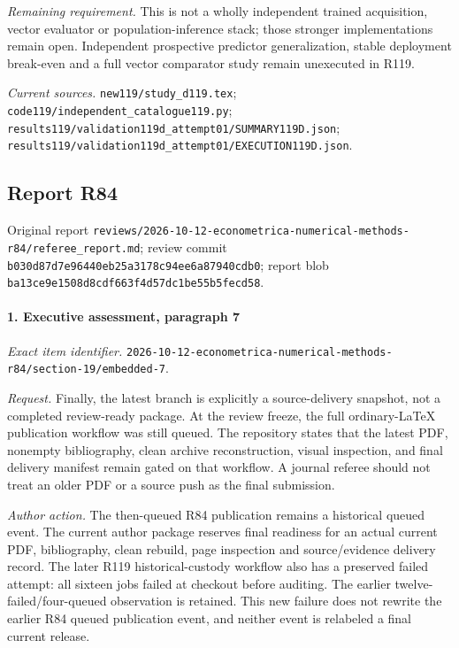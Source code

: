 \par\emph{Remaining requirement.} This is not a wholly independent trained acquisition, vector evaluator or population-inference stack; those stronger implementations remain open. Independent prospective predictor generalization, stable deployment break-even and a full vector comparator study remain unexecuted in R119.

\par\emph{Current sources.} \nolinkurl{new119/study_d119.tex}; \nolinkurl{code119/independent_catalogue119.py}; \nolinkurl{results119/validation119d_attempt01/SUMMARY119D.json}; \nolinkurl{results119/validation119d_attempt01/EXECUTION119D.json}.

\subsection{Report R84}

Original report \nolinkurl{reviews/2026-10-12-econometrica-numerical-methods-r84/referee_report.md}; review commit \nolinkurl{b030d87d7e96440eb25a3178c94ee6a87940cdb0}; report blob \nolinkurl{ba13ce9e1508d8cdf663f4d57dc1be55b5fecd58}.

\paragraph{1. Executive assessment, paragraph 7}

\emph{Exact item identifier.} \nolinkurl{2026-10-12-econometrica-numerical-methods-r84/section-19/embedded-7}.

\par\emph{Request.} Finally, the latest branch is explicitly a source-delivery snapshot, not a completed review-ready package. At the review freeze, the full ordinary-LaTeX publication workflow was still queued. The repository states that the latest PDF, nonempty bibliography, clean archive reconstruction, visual inspection, and final delivery manifest remain gated on that workflow. A journal referee should not treat an older PDF or a source push as the final submission.

\par\emph{Author action.} The then-queued R84 publication remains a historical queued event. The current author package reserves final readiness for an actual current PDF, bibliography, clean rebuild, page inspection and source/\allowbreak{}evidence delivery record. The later R119 historical-custody workflow also has a preserved failed attempt: all sixteen jobs failed at checkout before auditing. The earlier twelve-failed/\allowbreak{}four-queued observation is retained. This new failure does not rewrite the earlier R84 queued publication event, and neither event is relabeled a final current release.

